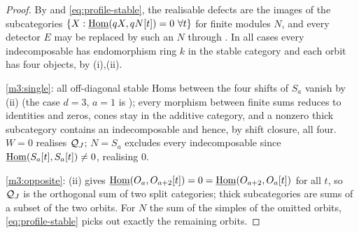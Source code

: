 \begin{proof}
By  and \eqref{eq:profile-stable}, the realisable defects are the images of the subcategories \(\{X:\underline{\operatorname{Hom}}(qX,qN[t])=0\ \forall t\}\) for finite modules \(N\), and every detector \(E\) may be replaced by such an \(N\) through .  In all cases every indecomposable has endomorphism ring \(k\) in the stable category and each orbit has four objects, by (i),(ii).

\ref{m3:single}: all off-diagonal stable Homs between the four shifts of \(S_a\) vanish by (ii) (the case \(d=3\), \(a=1\) is ); every morphism between finite sums reduces to identities and zeros, cones stay in the additive category, and a nonzero thick subcategory contains an indecomposable and hence, by shift closure, all four.  \(W=0\) realises \(\mathcal Q_J\); \(N=S_a\) excludes every indecomposable since \(\underline{\operatorname{Hom}}(S_a[t],S_a[t])\ne0\), realising \(0\).

\ref{m3:opposite}: (ii) gives \(\underline{\operatorname{Hom}}(O_a,O_{a+2}[t])=0=\underline{\operatorname{Hom}}(O_{a+2},O_a[t])\) for all \(t\), so \(\mathcal Q_J\) is the orthogonal sum of two split categories; thick subcategories are sums of a subset of the two orbits.  For \(N\) the sum of the simples of the omitted orbits, \eqref{eq:profile-stable} picks out exactly the remaining orbits.


\end{proof}
